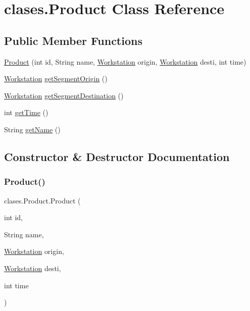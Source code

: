 \hypertarget{classclases_1_1_product}{}\section{clases.\+Product Class Reference}
\label{classclases_1_1_product}
\subsection*{Public Member Functions}
\begin{DoxyCompactItemize}
\item 
\mbox{\hyperlink{classclases_1_1_product_a57d72a4e60b93837e642ba36b5cf912b}{Product}} (int id, String name, \mbox{\hyperlink{classclases_1_1_workstation}{Workstation}} origin, \mbox{\hyperlink{classclases_1_1_workstation}{Workstation}} desti, int time)
\item 
\mbox{\hyperlink{classclases_1_1_workstation}{Workstation}} \mbox{\hyperlink{classclases_1_1_product_a6a97db66d1dbc50688a7ba745075e97f}{get\+Segment\+Origin}} ()
\item 
\mbox{\hyperlink{classclases_1_1_workstation}{Workstation}} \mbox{\hyperlink{classclases_1_1_product_a004b9df7d32b1c5e71aa65a1763922af}{get\+Segment\+Destination}} ()
\item 
int \mbox{\hyperlink{classclases_1_1_product_a3662b5c449fbdd04155eedf9785cb3e8}{get\+Time}} ()
\item 
String \mbox{\hyperlink{classclases_1_1_product_ad6f4a1848a82e41dce97ef287e5a720f}{get\+Name}} ()
\end{DoxyCompactItemize}


\subsection{Constructor \& Destructor Documentation}
\mbox{\label{classclases_1_1_product_a57d72a4e60b93837e642ba36b5cf912b}} 
\subsubsection{\texorpdfstring{Product()}{Product()}}
{\footnotesize\ttfamily clases.\+Product.\+Product (\begin{DoxyParamCaption}\item[{int}]{id,  }\item[{String}]{name,  }\item[{\mbox{\hyperlink{classclases_1_1_workstation}{Workstation}}}]{origin,  }\item[{\mbox{\hyperlink{classclases_1_1_workstation}{Workstation}}}]{desti,  }\item[{int}]{time }\end{DoxyParamCaption})}



